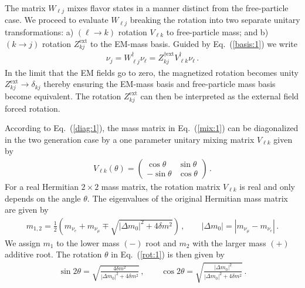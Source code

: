 \documentclass{ws-ijmpa}
\newcommand{\req}[1]{Eq.~(\ref{#1})}
\begin{document}
The matrix $W_{\ell j}$ mixes flavor states in a manner distinct from the free-particle case. We proceed to evaluate $W_{\ell j}$ breaking the rotation into two separate unitary transformations: a) $(\ell\rightarrow k)$ rotation $V_{\ell k}$ to free-particle mass; and b) $(k\rightarrow j)$ rotation $Z_{kj}^\mathrm{ext}$ to the EM-mass basis. Guided by \req{basis:1} we write
\begin{align}
\label{zrot:1}
\nu_{j} = W^{\dag}_{\ell j}\nu_{\ell} = Z_{kj}^{\dag\mathrm{ext}}V_{\ell k}^{\dag}\nu_{\ell}\,.
\end{align}
In the limit that the EM fields go to zero, the magnetized rotation becomes unity $Z_{kj}^\mathrm{ext}\rightarrow\delta_{kj}$ thereby ensuring the EM-mass basis and free-particle mass basis become equivalent. The rotation $Z_{kj}^\mathrm{ext}$ can then be interpreted as the external field forced rotation.

According to \req{diag:1}, the mass matrix in \req{mix:1} can be diagonalized in the two generation case by a one parameter unitary mixing matrix $V_{\ell k}$ given by
\begin{align}
\label{rot:1}
V_{\ell k}(\theta)=
\begin{pmatrix}
\cos\theta & \sin\theta\\
-\sin\theta & \cos\theta
\end{pmatrix}\,.
\end{align}
For a real Hermitian $2\times 2$ mass matrix, the rotation matrix $V_{\ell k}$ is real and only depends on the angle $\theta$. The eigenvalues of the original Hermitian mass matrix are given by
\begin{align}
\label{massroot:1}
m_{1,2}=\frac{1}{2}\left(m_{\nu_{e}}+m_{\nu_{\mu}}\mp\sqrt{|\Delta m_{0}|^{2}+4\delta m^{2}}\right)\,,\qquad
|\Delta m_{0}|=|m_{\nu_{\mu}}-m_{\nu_{e}}|\,.
\end{align}
We assign $m_{1}$ to the lower mass $(-)$ root and $m_{2}$ with the larger mass $(+)$ additive root. The rotation $\theta$ in \req{rot:1} is then given by
\begin{align}
\label{massroot:2}
\sin2\theta=\sqrt{\frac{4\delta m^{2}}{|\Delta m_{0}|^{2}+4\delta m^{2}}}\,,\qquad
\cos2\theta=\sqrt{\frac{|\Delta m_{0}|^{2}}{|\Delta m_{0}|^{2}+4\delta m^{2}}}\,.
\end{align}
\end{document}
